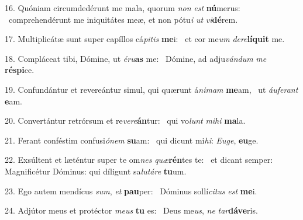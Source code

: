 16. Quóniam circumdedérunt me mala, quorum \textit{non} \textit{est} \textbf{nú}merus: \ast\  comprehendérunt me iniquitátes meæ, et non pótu\textit{i} \textit{ut} \textit{vi}\textbf{dé}rem.\

17. Multiplicátæ sunt super capíllos cá\textit{pi}\textit{tis} \textbf{me}i: \ast\  et cor me\textit{um} \textit{de}\textit{re}\textbf{lí}\textbf{quit} me.\

18. Compláceat tibi, Dómine, ut \textit{é}\textit{ru}\textbf{as} me: \ast\  Dómine, ad adju\textit{ván}\textit{dum} \textit{me} \textbf{ré}\textbf{spi}ce.\

19. Confundántur et revereántur simul, qui quærunt á\textit{ni}\textit{mam} \textbf{me}am, \ast\  ut \textit{áu}\textit{fe}\textit{rant} \textbf{e}am.\

20. Convertántur retrórsum et re\textit{ve}\textit{re}\textbf{án}tur: \ast\  qui vo\textit{lunt} \textit{mi}\textit{hi} \textbf{ma}la.\

21. Ferant conféstim confusi\textit{ó}\textit{nem} \textbf{su}am: \ast\  qui dicunt mi\textit{hi}: \textit{Eu}\textit{ge}, \textbf{eu}ge.\

22. Exsúltent et læténtur super te om\textit{nes} \textit{quæ}\textbf{rén}tes te: \ast\  et dicant semper: Magnificétur Dóminus: qui díligunt sa\textit{lu}\textit{tá}\textit{re} \textbf{tu}um.\

23. Ego autem mendícus \textit{sum}, \textit{et} \textbf{pau}per: \ast\  Dóminus sollí\textit{ci}\textit{tus} \textit{est} \textbf{me}i.\

24. Adjútor meus et protéctor \textit{me}\textit{us} \textbf{tu} es: \ast\  Deus me\textit{us}, \textit{ne} \textit{tar}\textbf{dá}\textbf{ve}ris.\

